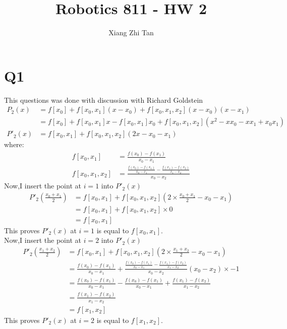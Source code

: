 \documentclass{article}
\begin{document}
\title{Robotics 811 - HW 2}
\author{Xiang Zhi Tan}

\maketitle

\section{Q1}
This questions was done with discussion with Richard Goldstein\\
\begin{equation*}
\begin{aligned}
P_2(x) &= f[x_0] + f[x_0, x_1](x - x_0) + f[x_0, x_1,x_2](x-x_0)(x-x_1)\\
&= f[x_0] + f[x_0, x_1]x - f[x_0, x_1]x_0 + f[x_0, x_1,x_2](x^{2} - xx_0 - xx_1 + x_0x_1)\\
P'_2(x) &= f[x_0, x_1] + f[x_0, x_1,x_2](2x - x_0 - x_1)
\end{aligned}
\end{equation*}
where:
\begin{equation*}
\begin{aligned}
f[x_0, x_1] &= \frac{f(x_0) - f(x_1)}{x_0 - x_1} \\
f[x_0, x_1,x_2] & = \frac{\frac{f(x_0) - f(x_1)}{x_0 - x_1} - \frac{f(x_1) - f(x_2)}{x_1 - x_2}}{x_0 - x_2}
\end{aligned}
\end{equation*}
Now,I insert the point at $i = 1$ into $P'_2(x)$
\begin{equation*}
\begin{aligned}
P'_2(\frac{x_0+x_1}{2}) &= f[x_0,x_1] +  f[x_0, x_1,x_2](2 \times \frac{x_0+x_1}{2} - x_0 - x_1)\\
& = f[x_0,x_1] +  f[x_0, x_1,x_2] \times 0\\
& = f[x_0,x_1]
\end{aligned}
\end{equation*}
This proves $P'_2(x)$ at $i = 1$ is equal to $f[x_0,x_1]$.\\
Now,I insert the point at $i = 2$ into $P'_2(x)$
\begin{equation*}
\begin{aligned}
P'_2(\frac{x_1+x_2}{2}) &= f[x_0,x_1] +  f[x_0, x_1,x_2](2 \times \frac{x_1+x_2}{2} - x_0 - x_1)\\
& = \frac{f(x_0) - f(x_1)}{x_0 - x_1} + \frac{\frac{f(x_0) - f(x_1)}{x_0 - x_1} - \frac{f(x_1) - f(x_2)}{x_1 - x_2}}{x_0 - x_2} (x_0 - x_2) \times -1\\
& = \frac{f(x_0) - f(x_1)}{x_0 - x_1} - \frac{f(x_0) - f(x_1)}{x_0 - x_1} + \frac{f(x_1) - f(x_2)}{x_1 - x_2} \\
& = \frac{f(x_1) - f(x_2)}{x_1 - x_2} \\
& = f[x_1,x_2]
\end{aligned}
\end{equation*}
This proves $P'_2(x)$ at $i = 2$ is equal to $f[x_1,x_2]$.\\
\end{document}
